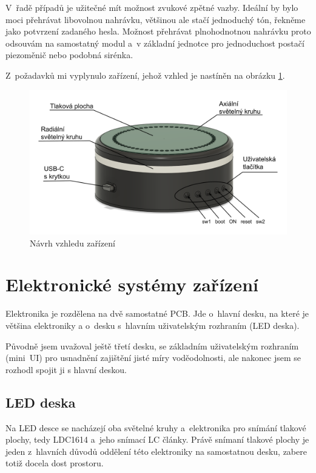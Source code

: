 V~řadě případů je užitečné mít možnost zvukové zpětné vazby.
Ideální by bylo moci přehrávat libovolnou nahrávku, většinou ale stačí jednoduchý tón, řekněme jako potvrzení zadaného hesla.
Možnost přehrávat plnohodnotnou nahrávku proto odsouvám na samostatný modul a~v základní jednotce pro jednoduchost postačí piezoměnič nebo podobná sirénka.

Z~požadavků mi vyplynulo zařízení, jehož vzhled je nastíněn na obrázku \ref{fig:AHS-nacrt}.
\begin{figure}
    \centering
    \includegraphics[width=\textwidth]{text/PraktickaCast/img/AHS-nacrt.png}
    \caption{Návrh vzhledu zařízení}
    \label{fig:AHS-nacrt}
\end{figure}

\newpage
\section{Elektronické systémy zařízení}

Elektronika je rozdělena na dvě samostatné PCB.
Jde o~hlavní desku, na které je většina elektroniky a o~desku s~hlavním uživatelským rozhraním (LED deska).

Původně jsem uvažoval ještě třetí desku, se základním uživatelským rozhraním (mini~UI) pro usnadnění zajištění jisté míry voděodolnosti, ale nakonec jsem se rozhodl spojit ji s hlavní deskou.

\subsection{LED deska}
Na LED desce se nacházejí oba světelné kruhy a~elektronika pro snímání tlakové plochy, tedy LDC1614 \cite{LDC1614} a~jeho snímací LC články.
Právě snímaní tlakové plochy je jeden z~hlavních důvodů oddělení této elektroniky na samostatnou desku, zabere totiž docela dost prostoru.

